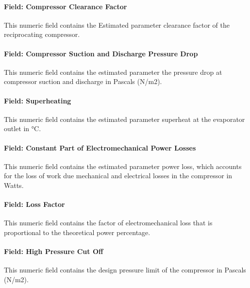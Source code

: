 \paragraph{Field: Compressor Clearance Factor}\label{field-compressor-clearance-factor-1-000}

This numeric field contains the Estimated parameter clearance factor of the reciprocating compressor.

\paragraph{Field: Compressor Suction and Discharge Pressure Drop}\label{field-compressor-suction-and-discharge-pressure-drop-1}

This numeric field contains the estimated parameter the pressure drop at compressor suction and discharge in Pascals (N/m2).

\paragraph{Field: Superheating}\label{field-superheating-1}

This numeric field contains the estimated parameter superheat at the evaporator outlet in °C.

\paragraph{Field: Constant Part of Electromechanical Power Losses}\label{field-constant-part-of-electromechanical-power-losses-1}

This numeric field contains the estimated parameter power loss, which accounts for the loss of work due mechanical and electrical losses in the compressor in Watts.

\paragraph{Field: Loss Factor}\label{field-loss-factor-1}

This numeric field contains the factor of electromechanical loss that is proportional to the theoretical power percentage.

\paragraph{Field: High Pressure Cut Off}\label{field-high-pressure-cut-off-1}

This numeric field contains the design pressure limit of the compressor in Pascals (N/m2).

